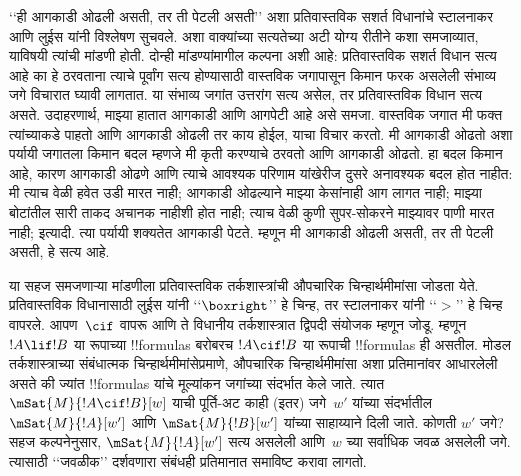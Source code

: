 \documentclass[../../../include/open-logic-section]{subfiles}
\begin{document}


‘‘ही आगकाडी ओढली असती, तर ती पेटली असती’’
अशा प्रतिवास्तविक सशर्त विधानांचे
स्टालनाकर आणि लुईस यांनी विश्लेषण सुचवले.
अशा वाक्यांच्या सत्यतेच्या अटी
योग्य रीतीने कशा समजाव्यात,
याविषयी त्यांची मांडणी होती.
दोन्ही मांडण्यांमागील कल्पना अशी आहे:
प्रतिवास्तविक सशर्त विधान सत्य आहे का
हे ठरवताना त्याचे पूर्वांग सत्य होण्यासाठी
वास्तविक जगापासून किमान फरक असलेली
संभाव्य जगे विचारात घ्यावी लागतात.
या संभाव्य जगांत उत्तरांग सत्य असेल,
तर प्रतिवास्तविक विधान सत्य असते.
उदाहरणार्थ, माझ्या हातात आगकाडी
आणि आगपेटी आहे असे समजा.
वास्तविक जगात मी फक्त त्यांच्याकडे
पाहतो आणि आगकाडी ओढली तर काय
होईल, याचा विचार करतो.
मी आगकाडी ओढतो अशा पर्यायी जगातला
किमान बदल म्हणजे मी कृती करण्याचे
ठरवतो आणि आगकाडी ओढतो.
हा बदल किमान आहे, कारण आगकाडी ओढणे आणि त्याचे
आवश्यक परिणाम यांखेरीज दुसरे अनावश्यक बदल होत नाहीत: मी त्याच वेळी
हवेत उडी मारत नाही; आगकाडी
ओढल्याने माझ्या केसांनाही आग
लागत नाही; माझ्या बोटांतील सारी
ताकद अचानक नाहीशी होत नाही;
त्याच वेळी कुणी सुपर-सोकरने
माझ्यावर पाणी मारत नाही;
इत्यादी. त्या पर्यायी शक्यतेत
आगकाडी पेटते. म्हणून मी
आगकाडी ओढली असती,
तर ती पेटली असती,
हे सत्य आहे.

या सहज समजणाऱ्या मांडणीला
प्रतिवास्तविक तर्कशास्त्रांची औपचारिक
चिन्हार्थमीमांसा जोडता येते.
प्रतिवास्तविक विधानासाठी लुईस यांनी
‘‘$\boxright$’’ हे चिन्ह, तर
स्टालनाकर यांनी ‘‘$>$’’ हे चिन्ह
वापरले. आपण~$\cif$ वापरू आणि
ते विधानीय तर्कशास्त्रात द्विपदी
संयोजक म्हणून जोडू.
म्हणून $!A \lif !B$ या रूपाच्या
!!{formula}s बरोबरच
$!A \cif !B$ या रूपाची
!!{formula}s ही असतील.
मोडल तर्कशास्त्राच्या संबंधात्मक
चिन्हार्थमीमांसेप्रमाणे, औपचारिक
चिन्हार्थमीमांसा अशा प्रतिमानांवर
आधारलेली असते की ज्यांत
!!{formula}s यांचे मूल्यांकन जगांच्या
संदर्भात केले जाते. त्यात
$\mSat{M}{!A \cif !B}[w]$
याची पूर्ति-अट काही (इतर) जगे~$w'$
यांच्या संदर्भातील
$\mSat{M}{!A}[w']$ आणि
$\mSat{M}{!B}[w']$
यांच्या साहाय्याने दिली जाते.
कोणती $w'$ जगे?
सहज कल्पनेनुसार,
$\mSat{M}{!A}[w']$ सत्य असलेली
आणि~$w$ च्या सर्वाधिक जवळ
असलेली जगे. त्यासाठी
‘‘जवळीक’’ दर्शवणारा
संबंधही प्रतिमानात
समाविष्ट करावा लागतो.
\end{document}
